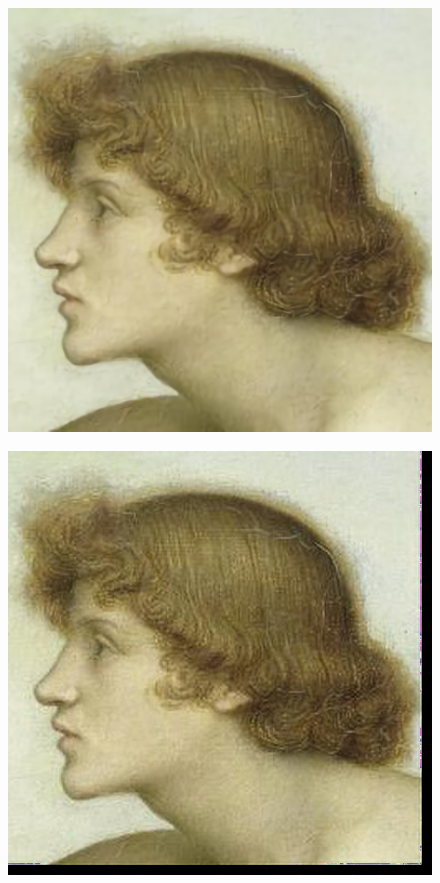 \documentclass{article}
\theoremstyle{definition}
\begin{document}
\begin{figure}[h]
\centering
\begin{minipage}{.5\textwidth}
  \centering
  \includegraphics[width=1\linewidth]{Imagenes/Phosphorus_and_Hesperus_Waifu2x.png}
  \label{fig:test1}
\end{minipage}%
\begin{minipage}{.5\textwidth}
  \centering
  \includegraphics[width=1\linewidth]{Imagenes/Phosphorus_and_Hesperus_UNet.png}
  \label{fig:test2}
\end{minipage}
\end{figure}
\end{document}
